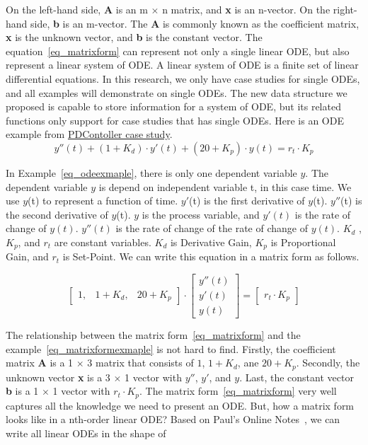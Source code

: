 On the left-hand side, \textbf{A} is an m $\times$ n matrix, and \textbf{x} is an n-vector. On the right-hand side, \textbf{b} is an m-vector. The \textbf{A} is commonly known as the coefficient matrix, \textbf{x} is the unknown vector, and \textbf{b} is the constant vector. The equation~\ref{eq_matrixform} can represent not only a single linear ODE, but also represent a linear system of ODE. A linear system of ODE is a finite set of linear differential equations. In this research, we only have case studies for single ODEs, and all examples will demonstrate on single ODEs. The new data structure we proposed is capable to store information for a system of ODE, but its related functions only support for case studies that has single ODEs. Here is an ODE example from \href{https://jacquescarette.github.io/Drasil/examples/pdcontroller/SRS/srs/PDController_SRS.html#Sec:IMs}{PDContoller case study}.
\begin{equation} \label{eq_odeexmaple}
	y''(t) + (1 + K_d) \cdot y'(t) + (20 + K_p) \cdot y(t) = r_t \cdot K_p
\end{equation}

In Example~\ref{eq_odeexmaple}, there is only one dependent variable $y$. The dependent variable $y$ is depend on independent variable t, in this case time. We use $y$(t) to represent a function of time. $y'$(t) is the first derivative of $y$(t). $y''$(t) is the second derivative of $y$(t). $y$ is the process variable, and $y'(t)$ is the rate of change of $y(t)$. $y''(t)$ is the rate of change of the rate of change of $y(t)$. $K_d$ , $K_p$, and $r_t$ are constant variables. $K_d$ is Derivative Gain, $K_p$ is Proportional Gain, and $r_t$ is Set-Point. We can write this equation in a matrix form as follows.

\begin{equation} \label{eq_matrixformexmaple}
	\begin{bmatrix}
		1, & 1 + K_{d}, & 20 + K_{p}
	\end{bmatrix}
	\cdot
	\begin{bmatrix}
		y''(t)  \\
		y'(t)   \\
		y(t)  
	\end{bmatrix}
	=
	\begin{bmatrix}
		r_{t} \cdot K_{p} 
	\end{bmatrix}
\end{equation}

The relationship between the matrix form~\ref{eq_matrixform} and the example~\ref{eq_matrixformexmaple} is not hard to find. Firstly, the coefficient matrix \textbf{A} is a 1 $\times$ 3 matrix that consists of $1$, $1 + K_d$, ane $20 + K_p$. Secondly, the unknown vector \textbf{x} is a 3 $\times$ 1 vector with $y''$, $y'$, and $y$. Last, the constant vector \textbf{b} is a 1 $\times$ 1 vector with $r_t \cdot K_p$. The matrix form~\ref{eq_matrixform} very well captures all the knowledge we need to present an ODE. But, how a matrix form looks like in a nth-order linear ODE? Based on Paul's Online Notes~\citep{paullinearode}, we can write all linear ODEs in the shape of

